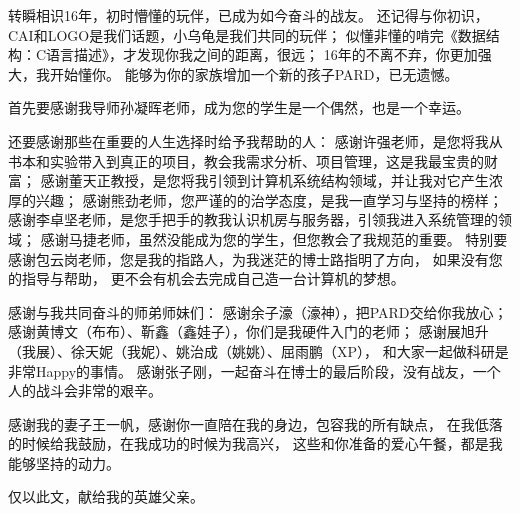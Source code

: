 
\begin{ack}

转瞬相识16年，初时懵懂的玩伴，已成为如今奋斗的战友。
还记得与你初识，CAI和LOGO是我们话题，小乌龟是我们共同的玩伴；
似懂非懂的啃完《数据结构：C语言描述》，才发现你我之间的距离，很远；
16年的不离不弃，你更加强大，我开始懂你。
能够为你的家族增加一个新的孩子PARD，已无遗憾。


首先要感谢我导师孙凝晖老师，成为您的学生是一个偶然，也是一个幸运。

还要感谢那些在重要的人生选择时给予我帮助的人：
感谢许强老师，是您将我从书本和实验带入到真正的项目，教会我需求分析、项目管理，这是我最宝贵的财富；
感谢董天正教授，是您将我引领到计算机系统结构领域，并让我对它产生浓厚的兴趣；
感谢熊劲老师，您严谨的的治学态度，是我一直学习与坚持的榜样；
感谢李卓坚老师，是您手把手的教我认识机房与服务器，引领我进入系统管理的领域；
感谢马捷老师，虽然没能成为您的学生，但您教会了我规范的重要。
特别要感谢包云岗老师，您是我的指路人，为我迷茫的博士路指明了方向，
如果没有您的指导与帮助，
更不会有机会去完成自己造一台计算机的梦想。

感谢与我共同奋斗的师弟师妹们：
感谢余子濠（濠神），把PARD交给你我放心；
感谢黄博文（布布）、靳鑫（鑫娃子），你们是我硬件入门的老师；
感谢展旭升（我展）、徐天妮（我妮）、姚治成（姚姚）、屈雨鹏（XP），
和大家一起做科研是非常Happy的事情。
感谢张子刚，一起奋斗在博士的最后阶段，没有战友，一个人的战斗会非常的艰辛。

感谢我的妻子王一帆，感谢你一直陪在我的身边，包容我的所有缺点，
在我低落的时候给我鼓励，在我成功的时候为我高兴，
这些和你准备的爱心午餐，都是我能够坚持的动力。

仅以此文，献给我的英雄父亲。
\newline\newline


\end{ack}
